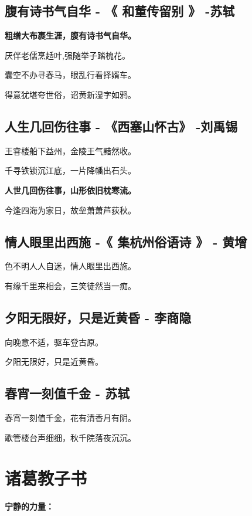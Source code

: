 \documentclass[UTF8,a4paper,8pt]{ctexart}
\begin{document}
 \subsection{腹有诗书气自华 - 《 和董传留别 》   -苏轼   }
 
 \textbf{粗缯大布裹生涯，腹有诗书气自华。}
 
 厌伴老儒烹趏叶,强随举子踏槐花。
 
 囊空不办寻春马，眼乱行看择婿车。
 
 得意犹堪夸世俗，诏黄新湿字如鸦。
 
 \subsection{人生几回伤往事 - 《西塞山怀古》   -刘禹锡} 
 
 王睿楼船下益州，金陵王气黯然收。
 
 千寻铁锁沉江底，一片降幡出石头。
 
 \textbf{人世几回伤往事，山形依旧枕寒流。}
 
 今逢四海为家日，故垒萧萧芦荻秋。
 
 \subsection{情人眼里出西施 -《 集杭州俗语诗 》  -   黄增  }
 
 色不明人人自迷，情人眼里出西施。
 
 有缘千里来相会，三笑徒然当一痴。
 
 \subsection{夕阳无限好，只是近黄昏  - 李商隐}
 
 向晚意不适，驱车登古原。
 
 夕阳无限好，只是近黄昏。
 
 \subsection{春宵一刻值千金 - 苏轼}
 
 春宵一刻值千金，花有清香月有阴。
 
 歌管楼台声细细，秋千院落夜沉沉。
 
 \newpage 
 \section{诸葛教子书}
 \paragraph{宁静的力量：}
 
\end{document}
